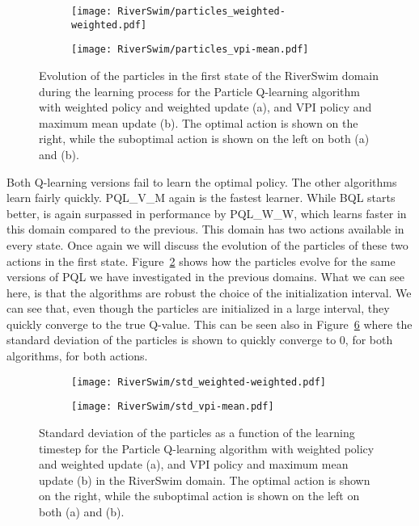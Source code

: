 \begin{figure}
\centering
\begin{subfigure}{\linewidth}
  \centering
  \texttt{[image: RiverSwim/particles\_weighted-weighted.pdf]}
  \label{fig:riverswim_particles_weighted_weighted}
  \caption{}
\end{subfigure}

\bigskip
\centering
\begin{subfigure}{\linewidth}
  \centering
  \texttt{[image: RiverSwim/particles\_vpi-mean.pdf]}
  \caption{}
  \label{fig:riverswim_particles_vpi_mean}
\end{subfigure}
\caption{Evolution of the particles in the first state of the RiverSwim domain during the learning process for the Particle Q-learning algorithm with weighted policy and weighted update (a), and VPI policy and maximum mean update (b). The optimal action is shown on the right, while the suboptimal action is shown on the left on both (a) and (b).}
\label{fig:riverswin_particle_evolution}
\end{figure}
Both Q-learning versions fail to learn the optimal policy. The other algorithms learn fairly quickly. PQL\_V\_M again is the fastest learner. While BQL starts better, is again surpassed in performance by PQL\_W\_W, which learns faster in this domain compared to the previous. This domain has two actions available in every state. Once again we will discuss the evolution of the particles of these two actions in the first state. Figure~\ref{fig:riverswim_particles_vpi_mean} shows how the particles evolve for the same versions of PQL we have investigated in the previous domains. What we can see here, is that the algorithms are robust \wrt the choice of the initialization interval. We can see that, even though the particles are initialized in a large interval, they quickly converge to the true Q-value. This can be seen also in Figure~\ref{fig:riverswim_std_evolution} where the standard deviation of the particles is shown to quickly converge to 0, for both algorithms, for both actions.\par
\begin{figure}
\centering
\begin{subfigure}{\linewidth}
  \centering
  \texttt{[image: RiverSwim/std\_weighted-weighted.pdf]}
  \label{fig:riverswim_std_weighted_weighted}
  \caption{}
\end{subfigure}%

\bigskip
\centering
\begin{subfigure}{\linewidth}
  \centering
  \texttt{[image: RiverSwim/std\_vpi-mean.pdf]}
  \label{fig:riverswim_std_vpi_mean}
  \caption{}
\end{subfigure}
\caption{Standard deviation of the particles as a function of the learning timestep for the Particle Q-learning algorithm with weighted policy and weighted update (a), and VPI policy and maximum mean update (b) in the RiverSwim domain. The optimal action  is shown on the right, while the suboptimal action is shown on the left on both (a) and (b).}
\label{fig:riverswim_std_evolution}
\end{figure}
